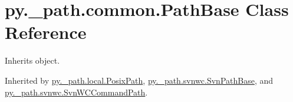 \hypertarget{classpy_1_1__path_1_1common_1_1_path_base}{}\section{py.\+\_\+path.\+common.\+Path\+Base Class Reference}
\label{classpy_1_1__path_1_1common_1_1_path_base}


Inherits object.



Inherited by \hyperlink{classpy_1_1__path_1_1local_1_1_posix_path}{py.\+\_\+path.\+local.\+Posix\+Path}, \hyperlink{classpy_1_1__path_1_1svnwc_1_1_svn_path_base}{py.\+\_\+path.\+svnwc.\+Svn\+Path\+Base}, and \hyperlink{classpy_1_1__path_1_1svnwc_1_1_svn_w_c_command_path}{py.\+\_\+path.\+svnwc.\+Svn\+W\+C\+Command\+Path}.

